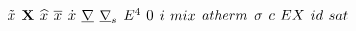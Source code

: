 \begin{mdframed}
$\exvecthree$ \newline
$\matrx$ \newline
$\intscal$ \newline
$\partmol$ \newline
$\tderiv$ \newline
$\gradop$ \newline
$\surfgradop$ \newline
$\axbiop$ \newline
$\init$ \newline
$\state$ \newline
$\mixfunc$ \newline
$\atfunc$ \newline
$\bound$ \newline
$\crit$ \newline
$\exfunc$ \newline
$\idgas$ \newline
$\satvap$ \newline

\end{mdframed}

